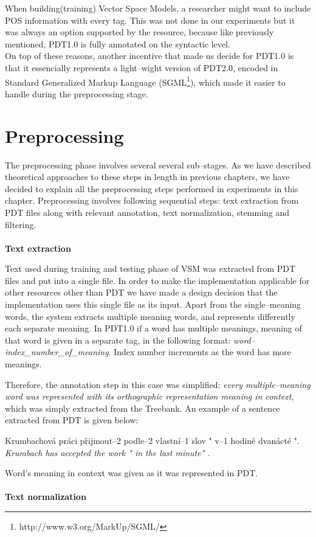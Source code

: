 When building(training) Vector Space Models, a researcher might want to include POS information with 
every tag. This was not done in our experiments but it was always an option supported by the resource, 
because like previously mentioned, PDT1.0 is fully annotated on the syntactic level. 
\\On top of these reasons, another incentive that made us decide for PDT1.0 is that it essencially 
represents a light--wight version of PDT2.0, encoded in Standard Generalized Markup Language 
(SGML\footnote{http://www.w3.org/MarkUp/SGML/}), which made it easier to handle during the 
preprocessing stage.

\section{Preprocessing}
The preprocessing phase involves several several sub--stages. As we have described theoretical approaches to these steps in length in previous chapters, we have decided to explain all the preprocessing steps performed in experiments in this chapter. Preprocessing involves following sequential steps: text extraction from PDT files along with relevant annotation, text normalization, stemming and filtering. 
\\\\  \textbf{Text extraction}

Text used during training and testing phase of VSM was extracted from PDT files and put into a single file. 
In order to make the implementation applicable for other resources other than PDT we have made a 
design decision that the implementation uses this single file as its input. Apart from the single--meaning 
words, the system extracts multiple meaning words, and represents differently each separate meaning. In 
PDT1.0 if a word has multiple meanings, meaning of that word is given in a separate tag, in the following format: 
\textit{word--index\_number\_of\_meaning}. Index number increments as the word has more meanings.

Therefore, the annotation step in this case was simplified: \textit{every multiple--meaning word was 
represented with its orthographic representation meaning in context}, which was simply extracted from 
the Treebank. An example of a sentence extracted from PDT is given below:
\begin{examples}
\item Krumbachov\'a pr\'aci p\^rijmout--2 podle--2 vlastn\'i--1 slov " v--1 hodin\^e dvan\'act\'e ".
\glt \textit{ Krumbach has accepted the work " in the last minute" .} 
\end{examples}
Word's meaning in context was given as it was represented in PDT.
\\\\  \textbf{Text normalization}

